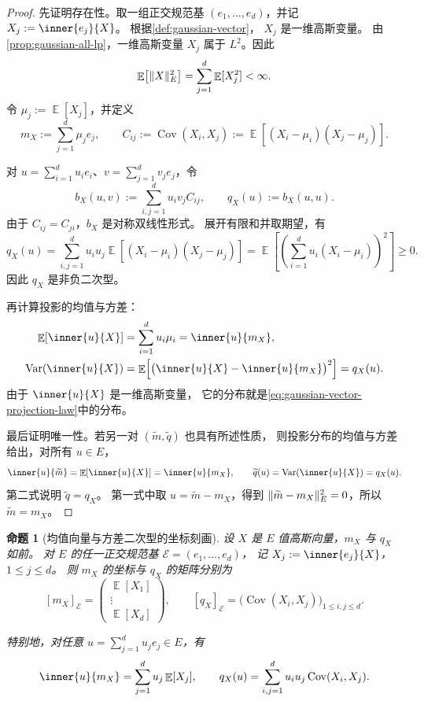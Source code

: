 \documentclass[UTF8,11pt,a4paper,oneside,fontset=fandol]{ctexrep}
\numberwithin{equation}{section}
\theoremstyle{plain}
\newtheorem{proposition}[theorem]{命题}
\theoremstyle{definition}
\theoremstyle{remark}
\DeclareMathOperator{\E}{\mathbb{E}}
\DeclareMathOperator{\Var}{Var}
\DeclareMathOperator{\Cov}{Cov}
\DeclarePairedDelimiter{\norm}{\lVert}{\rVert}
\begin{document}
\begin{proof}
先证明存在性。取一组正交规范基 $(e_1,\ldots,e_d)$，并记
$X_j:=\inner{e_j}{X}$。
根据\cref{def:gaussian-vector}， $X_j$ 是一维高斯变量。
由\cref{prop:gaussian-all-lp}，一维高斯变量 $X_j$ 属于 $L^2$。因此
\[
  \E\!\left[\norm{X}_E^2\right]
  =\sum_{j=1}^{d}\E[X_j^2]<\infty.
\]
令 $\mu_j:=\E[X_j]$，并定义
\[
  m_X:=\sum_{j=1}^{d}\mu_je_j,\qquad
  C_{ij}:=\Cov(X_i,X_j)
         :=\E\!\left[(X_i-\mu_i)(X_j-\mu_j)\right].
\]

对 $u=\sum_{i=1}^{d}u_ie_i$、$v=\sum_{j=1}^{d}v_je_j$，令
\[
  b_X(u,v):=\sum_{i,j=1}^{d}u_i v_j C_{ij},\qquad
  q_X(u):=b_X(u,u).
\]
由于 $C_{ij}=C_{ji}$，$b_X$ 是对称双线性形式。
展开有限和并取期望，有
\[
  q_X(u)
  =\sum_{i,j=1}^{d}u_i u_j
      \E\!\left[(X_i-\mu_i)(X_j-\mu_j)\right]
  =\E\!\left[
      \left(\sum_{i=1}^{d}u_i(X_i-\mu_i)\right)^2
    \right]\ge0.
\]
因此 $q_X$ 是非负二次型。

再计算投影的均值与方差：
\begin{align*}
  \E[\inner{u}{X}]
  &=\sum_{i=1}^{d}u_i\mu_i
    =\inner{u}{m_X},\\
  \Var(\inner{u}{X})
  &=\E\!\left[
       \bigl(\inner{u}{X}-\inner{u}{m_X}\bigr)^2
     \right]
    =q_X(u).
\end{align*}
由于 $\inner{u}{X}$ 是一维高斯变量，
它的分布就是\cref{eq:gaussian-vector-projection-law}中的分布。

最后证明唯一性。若另一对 $(\widetilde m,\widetilde q)$ 也具有所述性质，
则投影分布的均值与方差给出，对所有 $u\in E$，
\[
  \inner{u}{\widetilde m}
  =\E[\inner{u}{X}]
  =\inner{u}{m_X},
  \qquad
  \widetilde q(u)=\Var(\inner{u}{X})=q_X(u).
\]
第二式说明 $\widetilde q=q_X$。
第一式中取 $u=\widetilde m-m_X$，得到
$\norm{\widetilde m-m_X}_E^2=0$，所以 $\widetilde m=m_X$。
\end{proof}

\begin{proposition}[均值向量与方差二次型的坐标刻画]
\label{prop:gaussian-vector-covariance-coordinates}
设 $X$ 是 $E$ 值高斯向量，$m_X$ 与 $q_X$ 如前。
对 $E$ 的任一正交规范基 $\mathcal{E}=(e_1,\ldots,e_d)$，
记 $X_j:=\inner{e_j}{X}$，$1\le j\le d$。
则 $m_X$ 的坐标与 $q_X$ 的矩阵分别为
\[
  [m_X]_{\mathcal{E}}
  =\begin{pmatrix}
      \E[X_1]\\ \vdots\\ \E[X_d]
    \end{pmatrix},
  \qquad
  [q_X]_{\mathcal{E}}
  =\bigl(\Cov(X_i,X_j)\bigr)_{1\le i,j\le d}.
\]

特别地，对任意 $u=\sum_{j=1}^{d}u_j e_j\in E$，有
\begin{equation}
  \label{eq:gaussian-vector-covariance-form}
  \inner{u}{m_X}=\sum_{j=1}^{d}u_j\E[X_j],\qquad
  q_X(u)=\sum_{i,j=1}^{d}u_i u_j\Cov(X_i,X_j).
\end{equation}
\end{proposition}
\end{document}

